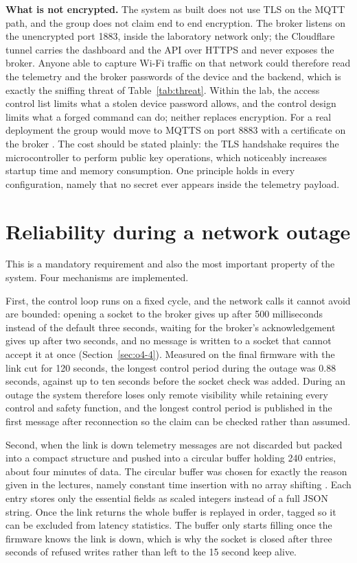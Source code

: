 \textbf{What is not encrypted.} The system as built does not use TLS on the MQTT path, and the group does not claim end to end encryption. The broker listens on the unencrypted port 1883, inside the laboratory network only; the Cloudflare tunnel carries the dashboard and the API over HTTPS and never exposes the broker. Anyone able to capture Wi-Fi traffic on that network could therefore read the telemetry and the broker passwords of the device and the backend, which is exactly the sniffing threat of Table~\ref{tab:threat}. Within the lab, the access control list limits what a stolen device password allows, and the control design limits what a forged command can do; neither replaces encryption. For a real deployment the group would move to MQTTS on port 8883 with a certificate on the broker \cite{slide03, rfc8446}. The cost should be stated plainly: the TLS handshake requires the microcontroller to perform public key operations, which noticeably increases startup time and memory consumption. One principle holds in every configuration, namely that no secret ever appears inside the telemetry payload.

\section{Reliability during a network outage}
\label{sec:o7-3}

This is a mandatory requirement and also the most important property of the system. Four mechanisms are implemented.

First, the control loop runs on a fixed cycle, and the network calls it cannot avoid are bounded: opening a socket to the broker gives up after 500 milliseconds instead of the default three seconds, waiting for the broker's acknowledgement gives up after two seconds, and no message is written to a socket that cannot accept it at once (Section~\ref{sec:o4-4}). Measured on the final firmware with the link cut for 120 seconds, the longest control period during the outage was 0.88 seconds, against up to ten seconds before the socket check was added. During an outage the system therefore loses only remote visibility while retaining every control and safety function, and the longest control period is published in the first message after reconnection so the claim can be checked rather than assumed.

Second, when the link is down telemetry messages are not discarded but packed into a compact structure and pushed into a circular buffer holding 240 entries, about four minutes of data. The circular buffer was chosen for exactly the reason given in the lectures, namely constant time insertion with no array shifting \cite{slide01}. Each entry stores only the essential fields as scaled integers instead of a full JSON string. Once the link returns the whole buffer is replayed in order, tagged so it can be excluded from latency statistics. The buffer only starts filling once the firmware knows the link is down, which is why the socket is closed after three seconds of refused writes rather than left to the 15 second keep alive.

